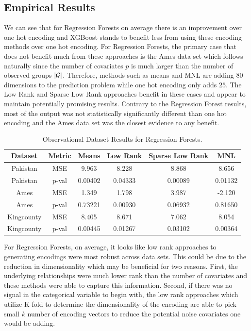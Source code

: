\documentclass{article}
\theoremstyle{plain}
\theoremstyle{definition}
\theoremstyle{remark}
\begin{document}

\subsection{Empirical Results}


We can see that for Regression Forests on average there is an improvement over one hot encoding and XGBoost stands to benefit less from using these encoding methods over one hot encoding. For Regression Forests, the primary case that does not benefit much from these approaches is the Ames data set which follows naturally since the number of covariates $p$ is much larger than the number of observed groups $|\mathcal{G}|$. Therefore, methods such as means and MNL are adding $80$ dimensions to the prediction problem while one hot encoding only adds $25$. The Low Rank and Sparse Low Rank approaches benefit in these cases and appear to maintain potentially promising results. Contrary to the Regression Forest results, most of the output was not statistically significantly different than one hot encoding and the Ames data set was the closest evidence to any benefit.

\begin{table}[H]
	\centering
	\begin{tabular}{|c|c|c|c|c|c|}
		\hline
		Dataset& Metric & Means & Low Rank & Sparse Low Rank & MNL  \\
		\hline
		Pakistan & MSE & 9.963 &8.228 &8.868 &8.656 \\
		Pakistan & p-val& 0.00402 & 0.04333&0.00089 &0.01132 \\
		\hline
		Ames & MSE & 1.349 & 1.798&3.987 &-2.120\\
		Ames & p-val&0.73221&0.00930&0.06932&0.81650 \\
		\hline
		Kingcounty & MSE &8.405&8.671&7.062& 8.054\\
		Kingcounty & p-val&0.00445&0.01267&0.03102&0.00364 \\
		\hline
	\end{tabular}
	\caption{Observational Dataset Results for Regression Forests.}
	\label{tab:observational}
\end{table}
For Regression Forests, on average, it looks like low rank approaches to generating encodings were most robust across data sets. This could be due to the reduction in dimensionality which may be beneficial  for two reasons. First, the underlying relationships were much lower rank than the number of covariates and these methods were able to capture this information. Second, if there was no signal in the categorical variable to begin with, the low rank approaches which utilize K-fold to determine the dimensionality of the encoding are able to pick small $k$ number of encoding vectors to reduce the potential noise covariates one would be adding.
\end{document}
